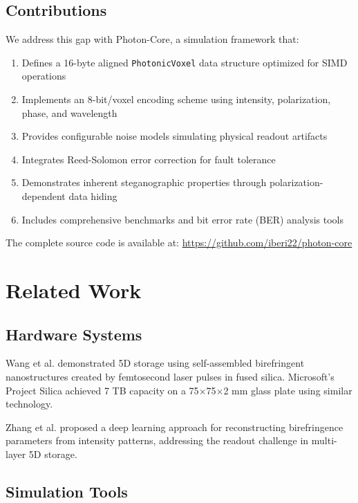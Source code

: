 \documentclass[11pt,a4paper]{article}
\begin{document}
\subsection{Contributions}

We address this gap with Photon-Core, a simulation framework that:
\begin{enumerate}
    \item Defines a 16-byte aligned \texttt{PhotonicVoxel} data structure optimized for SIMD operations
    \item Implements an 8-bit/voxel encoding scheme using intensity, polarization, phase, and wavelength
    \item Provides configurable noise models simulating physical readout artifacts
    \item Integrates Reed-Solomon error correction for fault tolerance
    \item Demonstrates inherent steganographic properties through polarization-dependent data hiding
    \item Includes comprehensive benchmarks and bit error rate (BER) analysis tools
\end{enumerate}

The complete source code is available at: \url{https://github.com/iberi22/photon-core}

\section{Related Work}

\subsection{Hardware Systems}

Wang et al. \cite{wang2024} demonstrated 5D storage using self-assembled birefringent nanostructures created by femtosecond laser pulses in fused silica. Microsoft's Project Silica \cite{silica2024} achieved 7 TB capacity on a 75$\times$75$\times$2 mm glass plate using similar technology.

Zhang et al. \cite{zhang2025} proposed a deep learning approach for reconstructing birefringence parameters from intensity patterns, addressing the readout challenge in multi-layer 5D storage.

\subsection{Simulation Tools}
\end{document}
